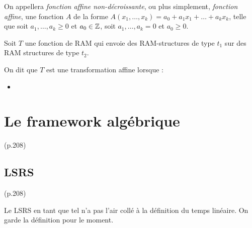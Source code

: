 		\begin{definition}
			On appellera \emph{fonction affine non-décroissante}, ou plus simplement, \emph{fonction affine}, une fonction $A$ de la forme $A(x_1, \dots, x_k) = a_0 + a_1 x_1 + \dots + a_k x_k$, telle que soit $a_1, \dots, a_k \geqslant 0$ et $a_0 \in \mathbb{Z}$, soit $a_1, \dots, a_k = 0$ et $a_0 \geqslant 0$.
		\end{definition}
		
		\begin{definition}
			\label{def:transfo_affine}
			Soit $T$ une fonction de RAM qui envoie des RAM-structures de type $t_1$ sur des RAM structures de type $t_2$. 
			
			On dit que $T$ est une transformation affine lorsque : 
			
			
			\begin{itemize}[itemsep=-1mm]
				\item 	
			\end{itemize}
		\end{definition}
		
		
		
	\section{Le framework algébrique} (p.208)
		\label{sec:framework_algebrique}

		\subsection{LSRS} (p.208)
			\label{subsec:LSRS}
		
		Le LSRS en tant que tel n'a pas l'air collé à la définition du temps linéaire. On garde la définition pour le moment.

